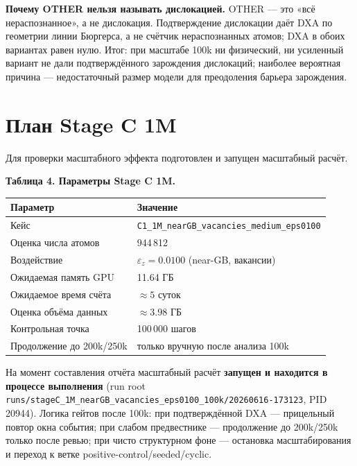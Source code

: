 \documentclass[14pt,a4paper]{extarticle}
\newcommand{\code}[1]{\texttt{#1}}
\newcommand{\tabcap}[1]{\par\smallskip\noindent\textbf{#1}\par\smallskip}
\begin{document}
\textbf{Почему OTHER нельзя называть дислокацией.} OTHER — это «всё нераспознанное», а не дислокация. Подтверждение дислокации даёт DXA по геометрии линии Бюргерса, а не счётчик нераспознанных атомов; DXA в обоих вариантах равен нулю. Итог: при масштабе 100k ни физический, ни усиленный вариант не дали подтверждённого зарождения дислокаций; наиболее вероятная причина — недостаточный размер модели для преодоления барьера зарождения.

\section{План Stage C 1M}
Для проверки масштабного эффекта подготовлен и запущен масштабный расчёт.

\tabcap{Таблица 4. Параметры Stage C 1M.}
\begin{longtable}{p{} p{}}
\toprule
Параметр & Значение \\
\midrule
\endhead
Кейс & \code{C1\_1M\_nearGB\_vacancies\_medium\_eps0100} \\
Оценка числа атомов & 944\,812 \\
Воздействие & $\varepsilon_z = 0.0100$ (near-GB, вакансии) \\
Ожидаемая память GPU & 11.64 ГБ \\
Ожидаемое время счёта & $\approx 5$ суток \\
Оценка объёма данных & $\approx 3.98$ ГБ \\
Контрольная точка & 100\,000 шагов \\
Продолжение до 200k/250k & только вручную после анализа 100k \\
\bottomrule
\end{longtable}

На момент составления отчёта масштабный расчёт \textbf{запущен и находится в процессе выполнения} (run root \code{runs/stageC\_1M\_nearGB\_vacancies\_eps0100\_100k/20260616-173123}, PID 20944). Логика гейтов после 100k: при подтверждённой DXA — прицельный повтор окна события; при слабом предвестнике — продолжение до 200k/250k только после ревью; при чисто структурном фоне — остановка масштабирования и переход к ветке positive-control/seeded/cyclic.

\end{document}
